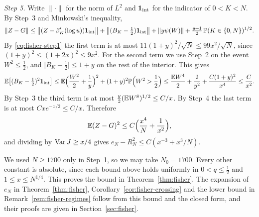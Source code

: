 \emph{Step 5.} Write $\lVert\cdot\rVert$ for the norm of $L^2$ and
$\mathbf 1_{\rm int}$ for the indicator of $0<K<N$. By Step~3 and
Minkowski's inequality,
\[
 \lVert Z-G\rVert\le
 \bigl\lVert(Z-\beta_K'(\log u))\mathbf 1_{\rm int}\bigr\rVert
 +\bigl\lVert(B_K-\tfrac12)\mathbf 1_{\rm int}\bigr\rVert
 +\lVert y\psi(W)\rVert
 +\tfrac{y+1}2\,\mathbb{P}(K\in\{0,N\})^{1/2}.
\]
By \eqref{eq:fisher-step1} the first term is at most
$11(1+y)^2/\sqrt N\le99x^2/\sqrt N$, since $(1+y)^2\le(1+2x)^2\le9x^2$. For
the second term we use Step~2 on the event $W^2\le\frac12$, and
$\lvert B_K-\frac12\rvert\le1+y$ on the rest of the interior. This gives
\[
 \mathbb{E}\bigl[(B_K-\tfrac12)^2\mathbf 1_{\rm int}\bigr]
 \le\mathbb{E}\Bigl(\frac{W^2}2+\frac1y\Bigr)^2+(1+y)^2\mathbb{P}\Bigl(W^2>\frac12\Bigr)
 \le\frac{\mathbb{E} W^4}2+\frac2{y^2}+\frac{C(1+y)^2}{x^4}\le\frac C{x^2}.
\]
By Step~3 the third term is at most $\frac y2(\mathbb{E} W^8)^{1/2}\le C/x$. By
Step~4 the last term is at most $Cxe^{-x/2}\le C/x$. Therefore
\[
 \mathbb{E}(Z-G)^2\le C\Bigl(\frac{x^4}N+\frac1{x^2}\Bigr),
\]
and dividing by $\operatorname{Var} J\ge x/4$ gives
$e_N-R^2_N\le C(x^{-3}+x^3/N)$.

We used $N\ge1700$ only in Step~1, so we may take $N_0=1700$. Every other
constant is absolute, since each bound above holds uniformly in
$0<q\le\frac12$ and $1\le x\le N^{1/4}$. This proves the bound in
Theorem~\ref{thm:fisher}. The expansion of $e_N$ in
Theorem~\ref{thm:fisher}, Corollary~\ref{cor:fisher-crossing} and the lower
bound in Remark~\ref{rem:fisher-regimes} follow from this bound and the
closed form, and their proofs are given in Section~\ref{sec:fisher}.
